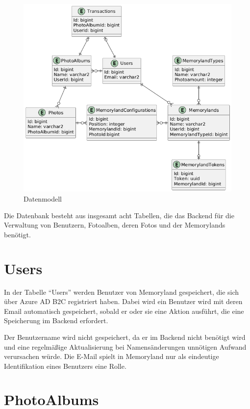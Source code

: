 
\begin{figure} [h t]
    \centering
    \includegraphics[scale=0.6]{puml/erd.png}
    \caption{Datenmodell}
    \label{fig:erd-diagram}
\end{figure}

Die Datenbank besteht aus insgesamt acht Tabellen, die das Backend 
für die Verwaltung von Benutzern, Fotoalben, deren Fotos und der 
Memorylands benötigt.

\section{Users}

In der Tabelle ``Users'' werden Benutzer von Memoryland gespeichert, die sich über Azure AD B2C
registriert haben. Dabei wird ein Benutzer wird mit deren Email automatisch gespeichert, sobald
er oder sie eine Aktion ausführt, die eine Speicherung im Backend erfordert. 

Der Benutzername wird nicht gespeichert, da er im Backend nicht benötigt wird und eine 
regelmäßige Aktualisierung bei Namensänderungen unnötigen Aufwand verursachen würde. Die 
E-Mail spielt in Memoryland nur als eindeutige Identifikation eines Benutzers eine Rolle.

\section{PhotoAlbums}

